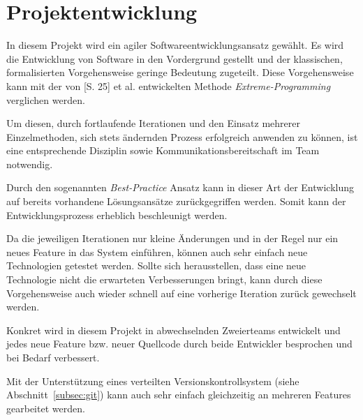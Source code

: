 \section{Projektentwicklung}
\label{sec:development}

In diesem Projekt wird ein agiler Softwareentwicklungsansatz gewählt. Es wird
	die Entwicklung von Software in den Vordergrund gestellt und der klassischen,
	formalisierten Vorgehensweise geringe Bedeutung zugeteilt. Diese Vorgehensweise
	kann mit der von \cite{Beck98}[S. 25] et al. entwickelten Methode
	\emph{Extreme-Programming} verglichen werden.
	
Um diesen, durch fortlaufende Iterationen und den Einsatz mehrerer Einzelmethoden,
	sich stets ändernden Prozess erfolgreich anwenden zu können, ist eine entsprechende
	Disziplin sowie Kommunikationsbereitschaft im Team notwendig.
	
Durch den sogenannten \emph{Best-Practice} Ansatz kann in dieser Art der Entwicklung
	auf bereits vorhandene Lösungsansätze zurückgegriffen werden. Somit kann der
	Entwicklungsprozess erheblich beschleunigt werden.
	
Da die jeweiligen Iterationen nur kleine Änderungen und in der Regel nur ein neues
	Feature in das System einführen, können auch sehr einfach neue Technologien
	getestet werden. Sollte sich herausstellen, dass eine neue Technologie nicht
	die erwarteten Verbesserungen bringt, kann durch diese Vorgehensweise auch wieder
	schnell auf eine vorherige Iteration zurück gewechselt werden.
	
Konkret wird in diesem Projekt in abwechselnden Zweierteams entwickelt und jedes
	neue Feature bzw. neuer Quellcode durch beide Entwickler besprochen und bei
	Bedarf verbessert.
	
Mit der Unterstützung eines verteilten Versionskontrollsystem (siehe
	Abschnitt~\ref{subsec:git}) kann auch sehr einfach gleichzeitig an mehreren
	Features gearbeitet werden.